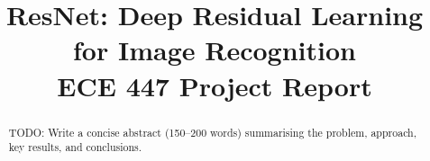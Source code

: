 \documentclass[conference]{IEEEtran}
\title{ResNet: Deep Residual Learning for Image Recognition\\
{\large ECE 447 Project Report}}
\author{%
  \IEEEauthorblockN{Author Name}
  \IEEEauthorblockA{ECE 447 -- Spring 2026}
}
\begin{document}
\maketitle

\begin{abstract}
  TODO: Write a concise abstract (150--200 words) summarising the problem,
  approach, key results, and conclusions.
\end{abstract}










\nocite{*}


\appendix

\end{document}
